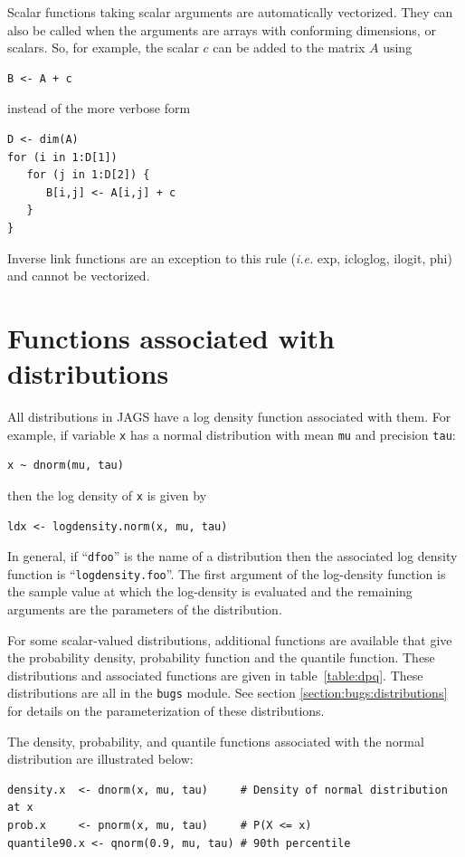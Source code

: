 \documentclass[11pt, a4paper, titlepage]{report}
\begin{document}
Scalar functions taking scalar arguments are automatically vectorized.
They can also be called when the arguments are arrays with conforming
dimensions, or scalars. So, for example, the scalar $c$ can be added to
the matrix $A$ using
\begin{verbatim}
B <- A + c
\end{verbatim}
instead of the more verbose form
\begin{verbatim}
D <- dim(A)
for (i in 1:D[1])
   for (j in 1:D[2]) {
      B[i,j] <- A[i,j] + c
   }
}
\end{verbatim}
Inverse link functions are an exception to this rule ({\em i.e.} exp,
icloglog, ilogit, phi) and cannot be vectorized. 



\section{Functions associated with distributions}

All distributions in JAGS have a log density function associated with
them.  For example, if variable \texttt{x} has a normal distribution
with mean \texttt{mu} and precision \texttt{tau}:
\begin{verbatim}
x ~ dnorm(mu, tau)
\end{verbatim}
then the log density of \texttt{x} is given by
\begin{verbatim}
ldx <- logdensity.norm(x, mu, tau)
\end{verbatim}
In general, if ``\texttt{dfoo}'' is the name of a distribution then
the associated log density function is
``\texttt{logdensity.foo}''. The first argument of the log-density
function is the sample value at which the log-density is evaluated and
the remaining arguments are the parameters of the distribution.

For some scalar-valued distributions, additional functions are
available that give the probability density, probability function and
the quantile function. These distributions and associated functions
are given in table~\ref{table:dpq}. These distributions are all in the
\texttt{bugs} module. See section \ref{section:bugs:distributions} for
details on the parameterization of these distributions.

The density, probability, and quantile functions associated with the
normal distribution are illustrated below:
\begin{verbatim}
density.x  <- dnorm(x, mu, tau)     # Density of normal distribution at x
prob.x     <- pnorm(x, mu, tau)     # P(X <= x)
quantile90.x <- qnorm(0.9, mu, tau) # 90th percentile
\end{verbatim}
\end{document}
